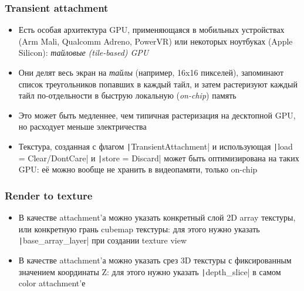 \documentclass[10pt]{beamer}
\begin{document}
\begin{frame}[fragile]
\frametitle{Transient attachment}
\begin{itemize}
\item Есть особая архитектура GPU, применяющаяся в мобильных устройствах (Arm Mali, Qualcomm Adreno, PowerVR) или некоторых ноутбуках (Apple Silicon): \textit{тайловые (tile-based) GPU}
\pause
\item Они делят весь экран на \textit{тайлы} (например, 16x16 пикселей), запоминают список треугольников попавших в каждый тайл, и затем растеризуют каждый тайл по-отдельности в быструю локальную (\textit{on-chip}) память
\pause
\item Это может быть медленнее, чем типичная растеризация на десктопной GPU, но расходует меньше электричества
\pause
\item Текстура, созданная с флагом \texttt|TransientAttachment| и использующая \texttt|load = Clear/DontCare| и \texttt|store = Discard| может быть оптимизирована на таких GPU: её можно вообще не хранить в видеопамяти, только on-chip
\end{itemize}
\end{frame}

\begin{frame}[fragile]
\frametitle{Render to texture}
\begin{itemize}
\item В качестве attachment'а можно указать конкретный слой 2D array текстуры, или конкретную грань cubemap текстуры: для этого нужно указать \texttt|base_array_layer| при создании texture view
\pause
\item В качестве attachment'а можно указать срез 3D текстуры с фиксированным значением координаты Z: для этого нужно указать \texttt|depth_slice| в самом color attachment'е
\end{itemize}
\end{frame}
\end{document}
